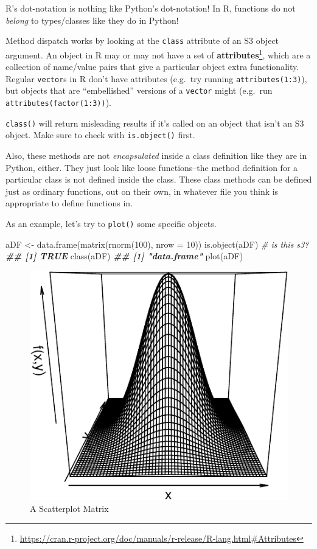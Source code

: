 \documentclass[
  12pt,
  krantz2]{krantz}
\makeatletter
\newenvironment{Shaded}{\begin{snugshade}}{\end{snugshade}}
\newcommand{\AttributeTok}[1]{\textcolor[rgb]{0.61,0.61,0.61}{#1}}
\newcommand{\CommentTok}[1]{\textcolor[rgb]{0.37,0.37,0.37}{\textit{#1}}}
\newcommand{\DecValTok}[1]{\textcolor[rgb]{0.06,0.06,0.06}{#1}}
\newcommand{\DocumentationTok}[1]{\textcolor[rgb]{0.37,0.37,0.37}{\textbf{\textit{#1}}}}
\newcommand{\FunctionTok}[1]{\textcolor[rgb]{0,0,0}{#1}}
\newcommand{\NormalTok}[1]{#1}
\newcommand{\OtherTok}[1]{\textcolor[rgb]{0.37,0.37,0.37}{#1}}
\renewcommand{\href}[2]{#2\footnote{\url{#1}}}
\newenvironment{kframe}{%
\medskip{}
\setlength{\fboxsep}{.8em}
 \def\at@end@of@kframe{}%
 \ifinner\ifhmode%
  \def\at@end@of@kframe{\end{minipage}}%
  \begin{minipage}{\columnwidth}%
 \fi\fi%
 \def\FrameCommand##1{\hskip\@totalleftmargin \hskip-\fboxsep
 \colorbox{shadecolor}{##1}\hskip-\fboxsep
     \hskip-\linewidth \hskip-\@totalleftmargin \hskip\columnwidth}%
 \MakeFramed {\advance\hsize-\width
   \@totalleftmargin\z@ \linewidth\hsize
   \@setminipage}}%
 {\par\unskip\endMakeFramed%
 \at@end@of@kframe}
\renewenvironment{Shaded}{\begin{kframe}}{\end{kframe}}
\makeatother
\begin{document}
R's dot-notation is nothing like Python's dot-notation! In R, functions do not \emph{belong} to types/classes like they do in Python!

Method dispatch works by looking at the \texttt{class} attribute of an S3 object argument. An object in R may or may not have a set of \href{https://cran.r-project.org/doc/manuals/r-release/R-lang.html\#Attributes}{\textbf{attributes}}, which are a collection of name/value pairs that give a particular object extra functionality. Regular \texttt{vector}s in R don't have attributes (e.g.~try running \texttt{attributes(1:3)}), but objects that are ``embellished'' versions of a \texttt{vector} might (e.g.~run \texttt{attributes(factor(1:3))}).

\texttt{class()} will return misleading results if it's called on an object that isn't an S3 object. Make sure to check with \texttt{is.object()} first.

Also, these methods are not \emph{encapsulated} inside a class definition like they are in Python, either. They just look like loose functions--the method definition for a particular class is not defined inside the class. These class methods can be defined just as ordinary functions, out on their own, in whatever file you think is appropriate to define functions in.

As an example, let's try to \texttt{plot()} some specific objects.

\begin{Shaded}
\begin{Highlighting}[]
\NormalTok{aDF }\OtherTok{\textless{}{-}} \FunctionTok{data.frame}\NormalTok{(}\FunctionTok{matrix}\NormalTok{(}\FunctionTok{rnorm}\NormalTok{(}\DecValTok{100}\NormalTok{), }\AttributeTok{nrow =} \DecValTok{10}\NormalTok{))}
\FunctionTok{is.object}\NormalTok{(aDF) }\CommentTok{\# is this s3?}
\DocumentationTok{\#\# [1] TRUE}
\FunctionTok{class}\NormalTok{(aDF)}
\DocumentationTok{\#\# [1] "data.frame"}
\FunctionTok{plot}\NormalTok{(aDF)}
\end{Highlighting}
\end{Shaded}

\begin{figure}

{\centering \includegraphics[width=0.5\linewidth]{r_and_python_book_files/figure-latex/unnamed-chunk-247-1} 

}

\caption{A Scatterplot Matrix}\label{fig:unnamed-chunk-247}
\end{figure}
\end{document}
